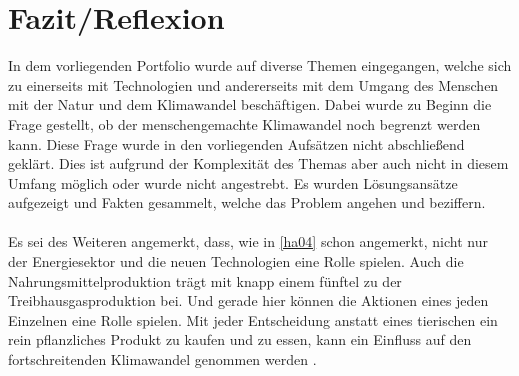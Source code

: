 \chapter{Fazit/Reflexion}
In dem vorliegenden Portfolio wurde auf diverse Themen eingegangen, welche sich zu einerseits mit Technologien und andererseits mit dem Umgang des Menschen mit der Natur und dem Klimawandel beschäftigen. Dabei wurde zu Beginn die Frage gestellt, ob der menschengemachte Klimawandel noch begrenzt werden kann. Diese Frage wurde in den vorliegenden Aufsätzen nicht abschließend geklärt. Dies ist aufgrund der Komplexität des Themas aber auch nicht in diesem Umfang möglich oder wurde nicht angestrebt. Es wurden Lösungsansätze aufgezeigt und Fakten gesammelt, welche das Problem angehen und beziffern.\\\\
Es sei des Weiteren angemerkt, dass, wie in \ref{ha04} schon angemerkt, nicht nur der Energiesektor und die neuen Technologien eine Rolle spielen. Auch die Nahrungsmittelproduktion trägt mit knapp einem fünftel zu der Treibhausgasproduktion bei. Und gerade hier können die Aktionen eines jeden Einzelnen eine Rolle spielen. Mit jeder Entscheidung anstatt eines tierischen ein rein pflanzliches Produkt zu kaufen und zu essen, kann ein Einfluss auf den fortschreitenden Klimawandel genommen werden \cite{poore_reducing_2018}.\\
